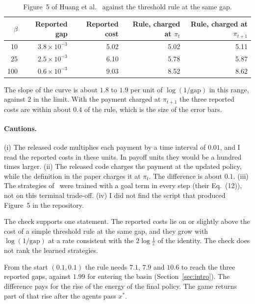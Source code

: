 \documentclass[11pt,a4paper]{article}
\theoremstyle{definition}
\theoremstyle{plain}
\newcommand{\xs}{x^{*}}
\begin{document}
\begin{table}[H]
\centering\small
\begin{tabular}{rrrrr}
\toprule
$\beta$ & Reported gap & Reported cost & Rule, charged at $\pi_t$ & Rule, charged at $\pi_{t+1}$\\
\midrule
10 & $3.8\times10^{-3}$ & 5.02 & 5.02 & 5.11\\
25 & $2.5\times10^{-3}$ & 6.10 & 5.78 & 5.87\\
100 & $0.6\times10^{-3}$ & 9.03 & 8.52 & 8.62\\
\bottomrule
\end{tabular}
\caption{Figure~5 of Huang et al.~\cite{huang2025} against the threshold rule at the same gap.}\label{tab:bench}
\end{table}

The slope of the curve is about $1.8$ to $1.9$ per unit of $\log(1/\text{gap})$ in this range, against $2$ in the limit. With the payment charged at $\pi_{t+1}$ the three reported costs are within about $0.4$ of the rule, which is the size of the error bars.

\paragraph{Cautions.}
(i) The released code multiplies each payment by a time interval of $0.01$, and I read the reported costs in these units. In payoff units they would be a hundred times larger. (ii) The released code charges the payment at the updated policy, while the definition in the paper charges it at $\pi_t$. The difference is about $0.1$. (iii) The strategies of~\cite{huang2025} were trained with a goal term in every step (their Eq.~(12)), not on this terminal trade-off. (iv) I did not find the script that produced Figure~5 in the repository.

The check supports one statement. The reported costs lie on or slightly above the cost of a simple threshold rule at the same gap, and they grow with $\log(1/\text{gap})$ at a rate consistent with the $2\log\frac1\varepsilon$ of the identity. The check does not rank the learned strategies.

From the start $(0.1,0.1)$ the rule needs $7.1$, $7.9$ and $10.6$ to reach the three reported gaps, against $1.99$ for entering the basin (Section~\ref{sec:intro}). The difference pays for the rise of the energy of the final policy. The game returns part of that rise after the agents pass $\xs$.

\end{document}
